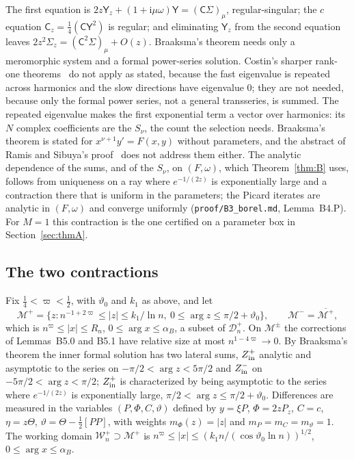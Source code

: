 \documentclass{amsart}
\numberwithin{equation}{section}
\theoremstyle{plain}
\theoremstyle{definition}
\theoremstyle{remark}
\newcommand{\iu}{\mathrm{i}}
\newcommand{\repo}[1]{\texttt{#1}}
\begin{document}
The first equation is $2z\mathsf Y_z + (1 + \iu\mu\omega)\mathsf Y = (\mathsf C\mathsf\Sigma)_\mu$, regular-singular; the $c$ equation
$\mathsf C_z = \tfrac14(\mathsf C\mathsf Y^2)$ is regular; and eliminating $\mathsf Y_z$ from the second equation leaves
$2z^2\mathsf\Sigma_z = (\mathsf C^2\mathsf\Sigma)_\mu + O(z)$. Braaksma's theorem needs only a meromorphic system and a formal
power-series solution. Costin's sharper rank-one theorems~\cite{Costin1998} do not apply as stated, because the fast
eigenvalue is repeated across harmonics and the slow directions have eigenvalue $0$; they are not needed, because only
the formal power series, not a general transseries, is summed. The repeated eigenvalue makes the first exponential term
a vector over harmonics: its $N$ complex coefficients are the $S_\nu$, the count the selection needs. Braaksma's theorem is
stated for $x^{\nu+1}y' = F(x, y)$ without parameters, and the abstract of Ramis and Sibuya's proof~\cite{RamisSibuya1994}
does not address them either. The analytic dependence of the sums, and of the $S_\nu$, on $(F, \omega)$, which
Theorem~\ref{thm:B} uses, follows from uniqueness on a ray where $e^{-1/(2z)}$ is exponentially large and a contraction there
that is uniform in the parameters; the Picard iterates are analytic in $(F, \omega)$ and converge uniformly
(\repo{proof/B3\_borel.md}, Lemma~B4.P). For $M = 1$ this contraction is the one certified on a parameter box in
Section~\ref{sec:thmA}.

\subsection{The two contractions}
Fix $\tfrac14 < \varpi < \tfrac12$, with $\vartheta_0$ and $k_1$ as above, and let
\[
\mathcal M^+ = \big\{z : n^{-1+2\varpi} \le |z| \le k_1/\ln n,\ 0 \le \arg z \le \pi/2 + \vartheta_0\big\}, \qquad \mathcal M^- = \overline{\mathcal M^+},
\]
which is $n^{\varpi} \le |x| \le R_n$, $0 \le \arg x \le \alpha_B$, a subset of $\mathcal D^+_n$. On $\mathcal M^\pm$ the corrections of
Lemmas~B5.0 and B5.1 have relative size at most $n^{1-4\varpi} \to 0$. By Braaksma's theorem the inner formal solution
has two lateral sums, $Z^+_{\rm in}$ analytic and asymptotic to the series on $-\pi/2 < \arg z < 5\pi/2$ and $Z^-_{\rm in}$ on
$-5\pi/2 < \arg z < \pi/2$; $Z^+_{\rm in}$ is characterized by being asymptotic to the series where $e^{-1/(2z)}$ is
exponentially large, $\pi/2 < \arg z \le \pi/2 + \vartheta_0$. Differences are measured in the variables
$(P, \Phi, C, \vartheta)$ defined by $y = \xi P$, $\Phi = 2zP_z$, $C = c$, $\eta = z\Theta$, $\vartheta = \Theta - \tfrac12[PP]$, with
weights $m_\Phi(z) = |z|$ and $m_P = m_C = m_\vartheta = 1$. The working domain $\mathcal W^+_n \supset \mathcal M^+$ is
$n^\varpi \le |x| \le (k_1n/(\cos\vartheta_0\ln n))^{1/2}$, $0 \le \arg x \le \alpha_B$.
\end{document}
